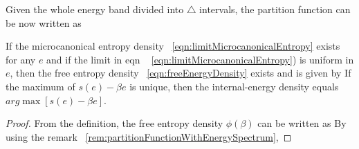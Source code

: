 \documentclass[letterpaper,english,12pt]{article}
\begin{document}
\begin{rem}
\label{rem:partitionFunctionWithEnergySpectrum}
Given the whole energy band divided into $\triangle$ intervals, the partition function can be now written as 

\end{rem}


\begin{prop}
If the microcanonical entropy density ~\eqref{eqn:limitMicrocanonicalEntropy} exists for any $e$ and if the limit in eqn ~
\eqref{eqn:limitMicrocanonicalEntropy}) is uniform in $e$, then the free entropy density ~\eqref{eqn:freeEnergyDensity} exists and is given by
If the maximum of $s(e)-\beta e$ is unique, then the internal-energy density equals $arg\max[s(e)-\beta e]$.
\end{prop}

\begin{proof}
From the definition, the free entropy density $\phi(\beta)$ can be written as
By using the remark ~\ref{rem:partitionFunctionWithEnergySpectrum},
\end{proof}
\end{document}
